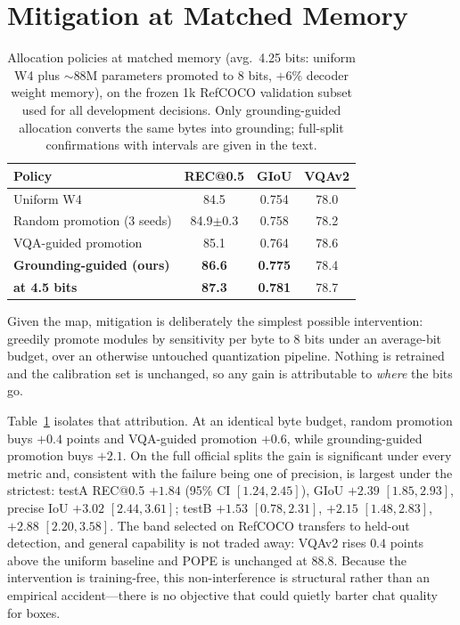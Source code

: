 \documentclass[letterpaper]{article} %
\begin{document}
\section{Mitigation at Matched Memory}

\begin{table}[t]
\centering
\small
\caption{Allocation policies at matched memory (avg.\ 4.25 bits: uniform W4 plus $\sim$88M parameters promoted to 8 bits, $+6\%$ decoder weight memory), on the frozen 1k RefCOCO validation subset used for all development decisions. Only grounding-guided allocation converts the same bytes into grounding; full-split confirmations with intervals are given in the text.}
\label{tab:alloc}
\begin{tabular}{lccc}
\toprule
Policy & REC@0.5 & GIoU & VQAv2 \\
\midrule
Uniform W4 & 84.5 & 0.754 & 78.0 \\
Random promotion (3 seeds) & 84.9$\pm$0.3 & 0.758 & 78.2 \\
VQA-guided promotion & 85.1 & 0.764 & 78.6 \\
\textbf{Grounding-guided (ours)} & \textbf{86.6} & \textbf{0.775} & 78.4 \\
\textbf{\quad at 4.5 bits} & \textbf{87.3} & \textbf{0.781} & 78.7 \\
\bottomrule
\end{tabular}
\end{table}

Given the map, mitigation is deliberately the simplest possible intervention: greedily promote modules by sensitivity per byte to 8 bits under an average-bit budget, over an otherwise untouched quantization pipeline. Nothing is retrained and the calibration set is unchanged, so any gain is attributable to \emph{where} the bits go.

Table~\ref{tab:alloc} isolates that attribution. At an identical byte budget, random promotion buys $+0.4$ points and VQA-guided promotion $+0.6$, while grounding-guided promotion buys $+2.1$. On the full official splits the gain is significant under every metric and, consistent with the failure being one of precision, is largest under the strictest: testA REC@0.5 $+1.84$ (95\% CI $[1.24, 2.45]$), GIoU $+2.39$ $[1.85, 2.93]$, precise IoU $+3.02$ $[2.44, 3.61]$; testB $+1.53$ $[0.78, 2.31]$, $+2.15$ $[1.48, 2.83]$, $+2.88$ $[2.20, 3.58]$. The band selected on RefCOCO transfers to held-out detection, and general capability is not traded away: VQAv2 rises $0.4$ points above the uniform baseline and POPE is unchanged at $88.8$. Because the intervention is training-free, this non-interference is structural rather than an empirical accident---there is no objective that could quietly barter chat quality for boxes.
\end{document}
